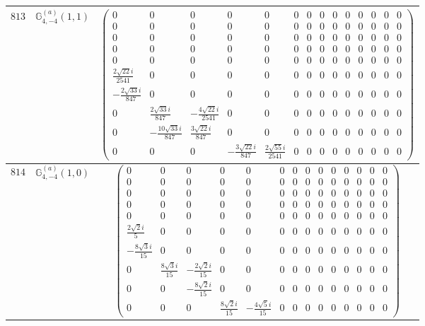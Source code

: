 \documentclass[fleqn,8pt,landscape]{jsarticle}
\begin{document}
\begin{center}
\begin{longtable}{ccc}
$ 813 $ & $ \mathbb{G}_{4,-4}^{(a)}(1,1) $ & $ \begin{pmatrix} 0 & 0 & 0 & 0 & 0 & 0 & 0 & 0 & 0 & 0 & 0 & 0 & 0 & 0 \\ 0 & 0 & 0 & 0 & 0 & 0 & 0 & 0 & 0 & 0 & 0 & 0 & 0 & 0 \\ 0 & 0 & 0 & 0 & 0 & 0 & 0 & 0 & 0 & 0 & 0 & 0 & 0 & 0 \\ 0 & 0 & 0 & 0 & 0 & 0 & 0 & 0 & 0 & 0 & 0 & 0 & 0 & 0 \\ 0 & 0 & 0 & 0 & 0 & 0 & 0 & 0 & 0 & 0 & 0 & 0 & 0 & 0 \\ \frac{2 \sqrt{22} i}{2541} & 0 & 0 & 0 & 0 & 0 & 0 & 0 & 0 & 0 & 0 & 0 & 0 & 0 \\ - \frac{2 \sqrt{33} i}{847} & 0 & 0 & 0 & 0 & 0 & 0 & 0 & 0 & 0 & 0 & 0 & 0 & 0 \\ 0 & \frac{2 \sqrt{33} i}{847} & - \frac{4 \sqrt{22} i}{2541} & 0 & 0 & 0 & 0 & 0 & 0 & 0 & 0 & 0 & 0 & 0 \\ 0 & - \frac{10 \sqrt{33} i}{847} & \frac{3 \sqrt{22} i}{847} & 0 & 0 & 0 & 0 & 0 & 0 & 0 & 0 & 0 & 0 & 0 \\ 0 & 0 & 0 & - \frac{3 \sqrt{22} i}{847} & \frac{2 \sqrt{55} i}{2541} & 0 & 0 & 0 & 0 & 0 & 0 & 0 & 0 & 0 \end{pmatrix} $ \\ \hline
$ 814 $ & $ \mathbb{G}_{4,-4}^{(a)}(1,0) $ & $ \begin{pmatrix} 0 & 0 & 0 & 0 & 0 & 0 & 0 & 0 & 0 & 0 & 0 & 0 & 0 & 0 \\ 0 & 0 & 0 & 0 & 0 & 0 & 0 & 0 & 0 & 0 & 0 & 0 & 0 & 0 \\ 0 & 0 & 0 & 0 & 0 & 0 & 0 & 0 & 0 & 0 & 0 & 0 & 0 & 0 \\ 0 & 0 & 0 & 0 & 0 & 0 & 0 & 0 & 0 & 0 & 0 & 0 & 0 & 0 \\ 0 & 0 & 0 & 0 & 0 & 0 & 0 & 0 & 0 & 0 & 0 & 0 & 0 & 0 \\ \frac{2 \sqrt{2} i}{5} & 0 & 0 & 0 & 0 & 0 & 0 & 0 & 0 & 0 & 0 & 0 & 0 & 0 \\ - \frac{8 \sqrt{3} i}{15} & 0 & 0 & 0 & 0 & 0 & 0 & 0 & 0 & 0 & 0 & 0 & 0 & 0 \\ 0 & \frac{8 \sqrt{3} i}{15} & - \frac{2 \sqrt{2} i}{15} & 0 & 0 & 0 & 0 & 0 & 0 & 0 & 0 & 0 & 0 & 0 \\ 0 & 0 & - \frac{8 \sqrt{2} i}{15} & 0 & 0 & 0 & 0 & 0 & 0 & 0 & 0 & 0 & 0 & 0 \\ 0 & 0 & 0 & \frac{8 \sqrt{2} i}{15} & - \frac{4 \sqrt{5} i}{15} & 0 & 0 & 0 & 0 & 0 & 0 & 0 & 0 & 0 \end{pmatrix} $ \\ \hline

\end{longtable}
\end{center}
\end{document}
